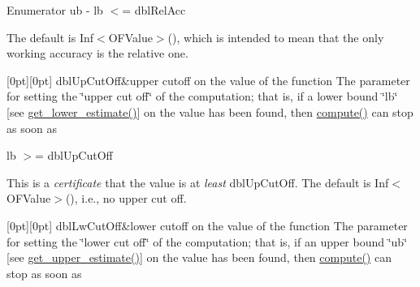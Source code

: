 \begin{DoxyEnumFields}{Enumerator}
ub -\/ lb $<$= dbl\+Rel\+Acc

The default is Inf$<$\+O\+F\+Value$>$(), which is intended to mean that the only working accuracy is the relative one. \\
\hline

[0pt][0pt]{}\mbox{\label{class_s_m_spp__di__unipi__it_1_1_function_ad7177cbeb2113eb7a975acec14d13027a22be127e17b811416b84944432a35ca5}} 
dbl\+Up\+Cut\+Off&upper cutoff on the value of the function The parameter for setting the \char`\"{}upper cut off\char`\"{} of the computation; that is, if a lower bound \char`\"{}lb\char`\"{} \mbox{[}see \mbox{\hyperlink{class_s_m_spp__di__unipi__it_1_1_function_aa55bc7e19736e8d640ad31ec134b94fb}{get\+\_\+lower\+\_\+estimate()}}\mbox{]} on the value has been found, then \mbox{\hyperlink{class_s_m_spp__di__unipi__it_1_1_function_a504d4e3e174c7a518cc66156a8a45ce5}{compute()}} can stop as soon as

lb $>$= dbl\+Up\+Cut\+Off

This is a {\itshape certificate} that the value is at {\itshape least} dbl\+Up\+Cut\+Off. The default is Inf$<$\+O\+F\+Value$>$(), i.\+e., no upper cut off. \\
\hline

[0pt][0pt]{}\mbox{\label{class_s_m_spp__di__unipi__it_1_1_function_ad7177cbeb2113eb7a975acec14d13027adaf90064ffac03f204c43a0adf226f58}} 
dbl\+Lw\+Cut\+Off&lower cutoff on the value of the function The parameter for setting the \char`\"{}lower cut off\char`\"{} of the computation; that is, if an upper bound \char`\"{}ub\char`\"{} \mbox{[}see \mbox{\hyperlink{class_s_m_spp__di__unipi__it_1_1_function_a018379619bc05b38bdab0e225016f98f}{get\+\_\+upper\+\_\+estimate()}}\mbox{]} on the value has been found, then \mbox{\hyperlink{class_s_m_spp__di__unipi__it_1_1_function_a504d4e3e174c7a518cc66156a8a45ce5}{compute()}} can stop as soon as


\end{DoxyEnumFields}
